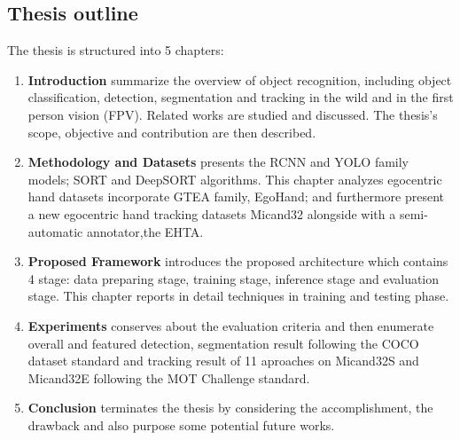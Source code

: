 \subsection{Thesis outline}
The thesis is structured into 5 chapters:
\begin{enumerate}
	\item \textbf{Introduction} summarize the overview of object recognition, including object classification, detection, segmentation and tracking in the wild and in the first person vision (FPV). Related works are studied and discussed. The thesis's scope, objective and contribution are then described.
	\item \textbf{Methodology and Datasets} presents the RCNN and YOLO family models; SORT and DeepSORT algorithms. This chapter analyzes egocentric hand datasets incorporate GTEA family, EgoHand; and furthermore present a new egocentric hand tracking datasets Micand32 alongside with a semi-automatic annotator,the EHTA.
	\item \textbf{Proposed Framework} introduces the proposed architecture which contains 4 stage: data preparing stage, training stage, inference stage and evaluation stage. This chapter reports in detail techniques in training and testing phase.
	\item \textbf{Experiments} conserves about the evaluation criteria and then enumerate overall and featured detection, segmentation result following the COCO dataset standard and tracking result of 11 aproaches on Micand32S and Micand32E following the MOT Challenge standard. 
	\item \textbf{Conclusion} terminates the thesis by considering the accomplishment, the drawback and also purpose some potential future works.
\end{enumerate}